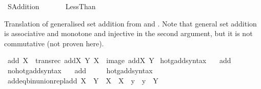 %
\begin{isabellebody}%
%
%
\isadelimdocument
%
\endisadelimdocument
%
\isatagdocument
\isanewline
%
\isamarkuptrue%
%
\endisatagdocument
{\isafolddocument}%
%
\isadelimdocument
%
\endisadelimdocument
%
\isadelimtheory
%
\endisadelimtheory
%
\isatagtheory
{}\isamarkupfalse%
\ SAddition\isanewline
\ \ \isanewline
\ \ \ \ Less{\isacharunderscore}{\kern0pt}Than\isanewline
{}%
\endisatagtheory
{\isafoldtheory}%
%
\isadelimtheory
%
\endisadelimtheory
%
\isadelimdocument
%
\endisadelimdocument
%
\isatagdocument
%
\isamarkuptrue%
%
\endisatagdocument
{\isafolddocument}%
%
\isadelimdocument
%
\endisadelimdocument
%
\begin{isamarkuptext}%
Translation of generalised set addition from \cite{kirby_set_arithemtics}
and \cite{ZFC_in_HOL_AFP}. Note that general set addition is associative and
monotone and injective in the second argument,
but it is not commutative (not proven here).%
\end{isamarkuptext}\isamarkuptrue%
\isamarkupfalse%
\ {\isachardoublequoteopen}add\ X\ {\isasymequiv}\ transrec\ {\isacharparenleft}{\kern0pt}{\isasymlambda}addX\ Y{\isachardot}{\kern0pt}\ X\ {\isasymunion}\ image\ addX\ Y{\isacharparenright}{\kern0pt}{\isachardoublequoteclose}\isanewline
\isanewline
{}\isamarkupfalse%
\ hotg{\isacharunderscore}{\kern0pt}add{\isacharunderscore}{\kern0pt}syntax\ \ \isamarkupfalse%
\ add\ {\isacharparenleft}{\kern0pt}\ {\isachardoublequoteopen}{\isacharplus}{\kern0pt}{\isachardoublequoteclose}\ {}{}{\isacharparenright}{\kern0pt}\ \isamarkupfalse%
\isanewline
{}\isamarkupfalse%
\ no{\isacharunderscore}{\kern0pt}hotg{\isacharunderscore}{\kern0pt}add{\isacharunderscore}{\kern0pt}syntax\ \ \isamarkupfalse%
\ add\ {\isacharparenleft}{\kern0pt}\ {\isachardoublequoteopen}{\isacharplus}{\kern0pt}{\isachardoublequoteclose}\ {}{}{\isacharparenright}{\kern0pt}\ \isamarkupfalse%
\isanewline
{}\isamarkupfalse%
\ hotg{\isacharunderscore}{\kern0pt}add{\isacharunderscore}{\kern0pt}syntax\isanewline
\isanewline
{}\isamarkupfalse%
\ add{\isacharunderscore}{\kern0pt}eq{\isacharunderscore}{\kern0pt}bin{\isacharunderscore}{\kern0pt}union{\isacharunderscore}{\kern0pt}repl{\isacharunderscore}{\kern0pt}add{\isacharcolon}{\kern0pt}\ {\isachardoublequoteopen}X\ {\isacharplus}{\kern0pt}\ Y\ {\isacharequal}{\kern0pt}\ X\ {\isasymunion}\ {\isacharbraceleft}{\kern0pt}X\ {\isacharplus}{\kern0pt}\ y\ {\isacharbar}{\kern0pt}\ y\ {\isasymin}\ Y{\isacharbraceright}{\kern0pt}{\isachardoublequoteclose}\isanewline

\end{isabellebody}
